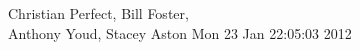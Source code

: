 \documentclass[12pt]{report}
\begin{document}
              {Christian Perfect, Bill Foster,\\Anthony Youd, Stacey Aston}
              {\small{Mon 23 Jan 22:05:03 2012}}


  


  \tableofcontents

  \clearpage


  
  
  
  
  
  
  
  
  
  

  \appendix

  

\end{document}
